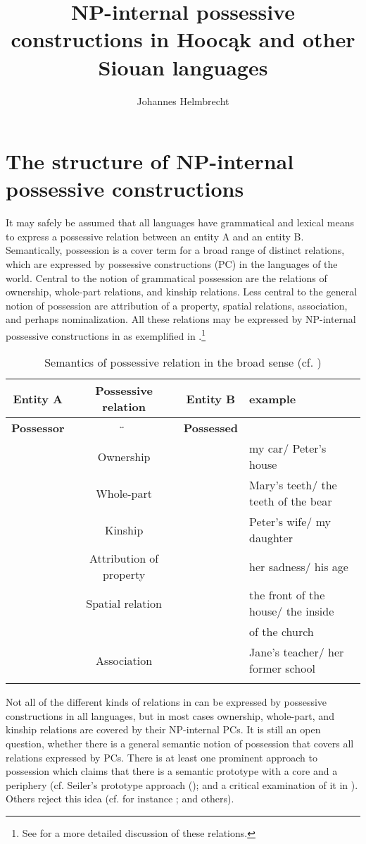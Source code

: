 \documentclass[output=paper]{LSP/langsci}
\author{Johannes Helmbrecht}
\title{{NP}-internal possessive constructions in {Hoocąk} and other {Siouan} languages}
\begin{document}
\section{The structure of NP-internal possessive constructions}
It may safely be assumed that all languages have grammatical and lexical means to express a possessive relation between an entity A and an entity B. Semantically, possession is a cover term for a broad range of distinct relations, which are expressed by possessive constructions (PC) in the languages of the world. Central to the notion of grammatical possession are the relations of ownership, whole-part relations, and kinship relations. Less central to the general notion of possession are attribution of a property, spatial relations, association, and perhaps nominalization. All these relations may be expressed by NP-internal possessive constructions in  as exemplified in .\footnote{See \citet[262--267]{Dixon2010} for a more detailed discussion of these relations.}

\begin{table}
\caption{Semantics of possessive relation in the broad sense (cf. \citealt[262--267]{Dixon2010})} \label{semantics}
\small
\begin{tabular}{ c c c l }
\lsptoprule
\textbf{Entity A}  & \textbf{Possessive relation}	 & \textbf{Entity B} & \textbf{\ili{English} example} \\
\midrule 
\textbf{Possessor} & $\overleftrightarrow{\hspace{3cm}}$  & \textbf{Possessed} & \\
& Ownership	&  & my car/ Peter's house \\
& Whole-part	 & & Mary's teeth/ the teeth of the bear \\
& Kinship	 & & Peter's wife/ my daughter \\
& Attribution of property & & her sadness/ his age \\
& Spatial relation & & the front of the house/ the inside   \\
& & & of the church \\
& Association & & Jane's teacher/ her former school \\
\lspbottomrule
\end{tabular}
\end{table}

Not all of the different kinds of relations in  can be expressed by possessive constructions in all languages, but in most cases ownership, whole-part, and kinship relations are covered by their NP-internal PCs. It is still an open question, whether there is a general semantic notion of possession that covers all relations expressed by PCs. There is at least one prominent approach to possession which claims that there is a semantic prototype with a core and a periphery (cf. Seiler's prototype approach (\citealt{Seiler1983,Seiler2001}); and a critical examination of it in \citealt{Helmbrecht2003}). Others reject this idea (cf. for instance \citealt{Heine1997}; \citealt[263]{Dixon2010} and others).
\end{document}
